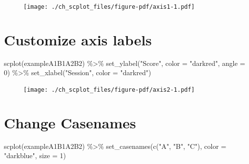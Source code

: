 \documentclass[
  letterpaper,
  DIV=11,
  numbers=noendperiod]{scrreprt}
\newenvironment{Shaded}{\begin{snugshade}}{\end{snugshade}}
\newcommand{\AttributeTok}[1]{\textcolor[rgb]{0.40,0.45,0.13}{#1}}
\newcommand{\DecValTok}[1]{\textcolor[rgb]{0.68,0.00,0.00}{#1}}
\newcommand{\FunctionTok}[1]{\textcolor[rgb]{0.28,0.35,0.67}{#1}}
\newcommand{\NormalTok}[1]{\textcolor[rgb]{0.00,0.23,0.31}{#1}}
\newcommand{\SpecialCharTok}[1]{\textcolor[rgb]{0.37,0.37,0.37}{#1}}
\newcommand{\StringTok}[1]{\textcolor[rgb]{0.13,0.47,0.30}{#1}}
\begin{document}
\begin{figure}[H]

{\centering \texttt{[image: ./ch\_scplot\_files/figure-pdf/axis1-1.pdf]}

}

\end{figure}

\hypertarget{customize-axis-labels}{%
\section{Customize axis labels}\label{customize-axis-labels}}

\begin{Shaded}
\begin{Highlighting}[]
\FunctionTok{scplot}\NormalTok{(exampleA1B1A2B2) }\SpecialCharTok{\%\textgreater{}\%} 
  \FunctionTok{set\_ylabel}\NormalTok{(}\StringTok{"Score"}\NormalTok{, }\AttributeTok{color =} \StringTok{"darkred"}\NormalTok{, }\AttributeTok{angle =} \DecValTok{0}\NormalTok{) }\SpecialCharTok{\%\textgreater{}\%}
  \FunctionTok{set\_xlabel}\NormalTok{(}\StringTok{"Session"}\NormalTok{, }\AttributeTok{color =} \StringTok{"darkred"}\NormalTok{)}
\end{Highlighting}
\end{Shaded}

\begin{figure}[H]

{\centering \texttt{[image: ./ch\_scplot\_files/figure-pdf/axis2-1.pdf]}

}

\end{figure}

\hypertarget{change-casenames}{%
\section{Change Casenames}\label{change-casenames}}

\begin{Shaded}
\begin{Highlighting}[]
\FunctionTok{scplot}\NormalTok{(exampleA1B1A2B2) }\SpecialCharTok{\%\textgreater{}\%}
  \FunctionTok{set\_casenames}\NormalTok{(}\FunctionTok{c}\NormalTok{(}\StringTok{"A"}\NormalTok{, }\StringTok{"B"}\NormalTok{, }\StringTok{"C"}\NormalTok{), }\AttributeTok{color =} \StringTok{"darkblue"}\NormalTok{, }\AttributeTok{size =} \DecValTok{1}\NormalTok{)}
\end{Highlighting}
\end{Shaded}
\end{document}
